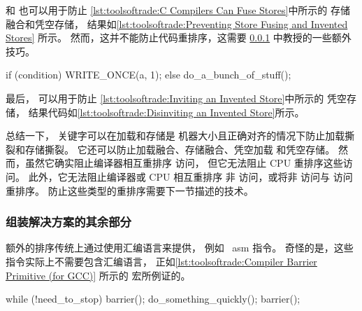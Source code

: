  和  也可以用于防止
\cref{lst:toolsoftrade:C Compilers Can Fuse Stores}中所示的
存储融合和凭空存储，
结果如\cref{lst:toolsoftrade:Preventing Store Fusing and Invented Stores}
所示。
然而，这并不能防止代码重排序，这需要
\cref{sec:toolsoftrade:Assembling the Rest of a Solution}
中教授的一些额外技巧。

\begin{listing}
\begin{fcvlabel}
\begin{VerbatimL}[commandchars=\\\{\}]
if (condition)
	WRITE_ONCE(a, 1);
else
	do_a_bunch_of_stuff();
\end{VerbatimL}
\end{fcvlabel}
\caption{取消招致凭空存储}
\label{lst:toolsoftrade:Disinviting an Invented Store}
\end{listing}

最后， 可以用于防止
\cref{lst:toolsoftrade:Inviting an Invented Store}中所示的
凭空存储，
结果代码如\cref{lst:toolsoftrade:Disinviting an Invented Store}所示。

总结一下， 关键字可以在加载和存储是
机器大小且正确对齐的情况下防止加载撕裂和存储撕裂。
它还可以防止加载融合、存储融合、凭空加载
和凭空存储。
然而，虽然它确实阻止编译器相互重排序  访问，
但它无法阻止 CPU 重排序这些访问。
此外，它无法阻止编译器或 CPU 相互重排序
非  访问，或将非  访问与
 访问重排序。
防止这些类型的重排序需要下一节描述的技术。

\subsubsection{组装解决方案的其余部分}
\label{sec:toolsoftrade:Assembling the Rest of a Solution}

额外的排序传统上通过使用汇编语言来提供，
例如 \GCC\ asm 指令。
奇怪的是，这些指令实际上不需要包含汇编语言，
正如\cref{lst:toolsoftrade:Compiler Barrier Primitive (for GCC)}
所示的  宏所例证的。

\begin{listing}
\begin{fcvlabel}
\begin{VerbatimL}[commandchars=\\\[\]]
while (!need_to_stop) {
	barrier(); \lnlbl[b1]
	do_something_quickly();
	barrier(); \lnlbl[b2]
}
\end{VerbatimL}
\end{fcvlabel}
\caption{防止 C 编译器融合加载}
\label{lst:toolsoftrade:Preventing C Compilers From Fusing Loads}
\end{listing}

